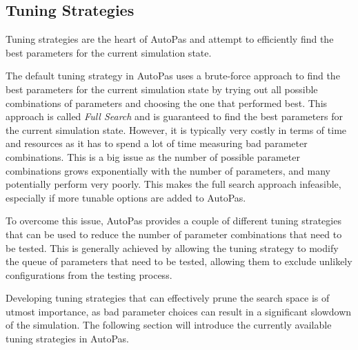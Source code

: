 \subsection{Tuning Strategies}

Tuning strategies are the heart of AutoPas and attempt to efficiently find the best parameters for the current simulation state.

The default tuning strategy in AutoPas uses a brute-force approach to find the best parameters for the current simulation state by trying out all possible combinations of parameters and choosing the one that performed best. This approach is called \emph{Full Search} and is guaranteed to find the best parameters for the current simulation state. However, it is typically very costly in terms of time and resources as it has to spend a lot of time measuring bad parameter combinations. This is a big issue as the number of possible parameter combinations grows exponentially with the number of parameters, and many potentially perform very poorly. This makes the full search approach infeasible, especially if more tunable options are added to AutoPas.

To overcome this issue, AutoPas provides a couple of different tuning strategies that can be used to reduce the number of parameter combinations that need to be tested. This is generally achieved by allowing the tuning strategy to modify the queue of parameters that need to be tested, allowing them to exclude unlikely configurations from the testing process.

Developing tuning strategies that can effectively prune the search space is of utmost importance, as bad parameter choices can result in a significant slowdown of the simulation. The following section will introduce the currently available tuning strategies in AutoPas.

